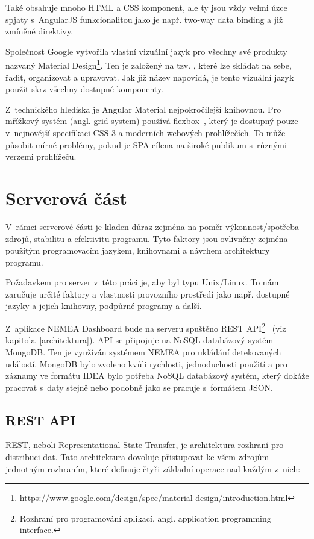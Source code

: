 Také obsahuje mnoho HTML a CSS komponent, ale ty jsou vždy velmi úzce spjaty s~AngularJS funkcionalitou jako je např. two-way data binding a již zmíněné direktivy. 

Společnost Google vytvořila vlastní vizuální jazyk pro všechny své produkty nazvaný Material Design\footnote{\url{https://www.google.com/design/spec/material-design/introduction.html}}. Ten je založený na tzv. , které lze skládat na sebe, řadit, organizovat a upravovat. Jak již název napovídá, je tento vizuální jazyk použit skrz všechny dostupné komponenty.

Z~technického hlediska je Angular Material nejpokročilejší knihovnou. Pro mřížkový systém (angl. grid system) používá flexbox~\cite{flexbox}, který je dostupný pouze v~nejnovější specifikaci CSS 3 a moderních webových prohlížečích. To může působit mírné problémy, pokud je SPA cílena na široké publikum s~různými verzemi prohlížečů.


\section{Serverová část}

V~rámci serverové části je kladen důraz zejména na poměr výkonnost/spotřeba zdrojů, stabilitu a efektivitu programu. Tyto faktory jsou ovlivněny zejména použitým programovacím jazykem, knihovnami a návrhem architektury programu.

Požadavkem pro server v~této práci je, aby byl typu Unix/Linux. To nám zaručuje určité faktory a vlastnosti provozního prostředí jako např. dostupné jazyky a jejich knihovny, podpůrné programy a další.

Z~aplikace NEMEA Dashboard bude na serveru spuštěno REST API\footnote{Rozhraní pro programování aplikací, angl. application programming interface.}~\cite{rest} (viz kapitola~\ref{architektura}). API se připojuje na NoSQL databázový systém MongoDB. Ten je využíván systémem NEMEA pro ukládání detekovaných událostí. MongoDB bylo zvoleno kvůli rychlosti, jednoduchosti použití a pro záznamy ve formátu IDEA bylo potřeba NoSQL databázový systém, který dokáže pracovat s~daty stejně nebo podobně jako se pracuje s~formátem JSON.

\subsection{REST API}
\label{crud}

REST, neboli Representational State Transfer, je architektura rozhraní pro distribuci dat. Tato architektura dovoluje přistupovat ke všem zdrojům jednotným rozhraním, které definuje čtyři základní operace nad každým z~nich:

